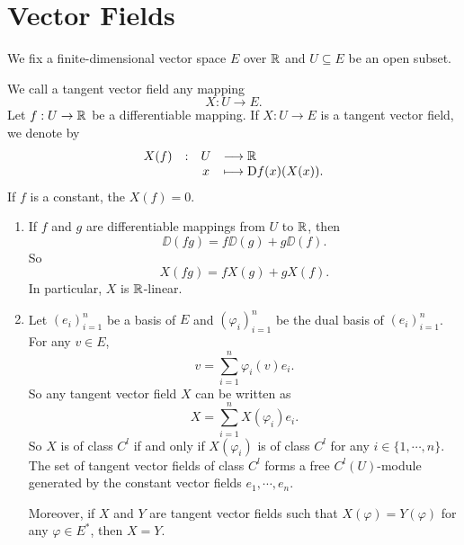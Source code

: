 \section{Vector Fields}


We fix a finite-dimensional vector space $E$ over $\mathbb{R}$ and $U \subseteq E$ be an open subset.

\begin{definitionenv}
    We call a tangent vector field any mapping 
    $$X : U \longrightarrow E.$$
    Let $f : U \rightarrow \mathbb{R}$ be a differentiable mapping.
    If $X : U \rightarrow E$ is a tangent vector field, we denote by 
    $$\begin{array}{rrcl}
        X(f) & : & U & \longrightarrow \mathbb{R} \\
             &   & x & \longmapsto \mathrm{D} f(x)(X(x)).
    \end{array}$$
    If $f$ is a constant, the $X(f) = 0$.
\end{definitionenv}

\begin{remark}
    \quad 
    \begin{enumerate}
        \item If $f$ and $g$ are differentiable mappings from $U$ to $\mathbb{R}$, then 
            $$\DD(fg) = f \DD (g) + g \DD (f).$$
            So
            $$X(fg) = f X(g) + g X(f).$$
            In particular, $X$ is $\mathbb{R}$-linear.
        \item Let $(e_i)_{i=1}^n$ be a basis of $E$ and $(\varphi_i)_{i=1}^n$ be the dual basis of $(e_i)_{i=1}^{n}$.
            For any $v \in E$,
            $$v = \sum_{i=1}^{n} \varphi_i (v) e_i.$$
            So any tangent vector field $X$ can be written as
            $$X = \sum_{i=1}^{n} X(\varphi_i) e_i.$$
            So $X$ is of class $C^l$ if and only if $X(\varphi_i)$ is of class $C^l$ for any $i \in \{1,\cdots,n\}$.
            The set of tangent vector fields of class $C^l$ forms a free $C^l(U)$-module generated by the constant vector fields $e_1,\cdots,e_n$.
            
            \quad Moreover, if $X$ and $Y$ are tangent vector fields such that $X(\varphi) = Y(\varphi)$ for any $\varphi \in E^*$, then $X = Y$.
   \end{enumerate}
\end{remark}


